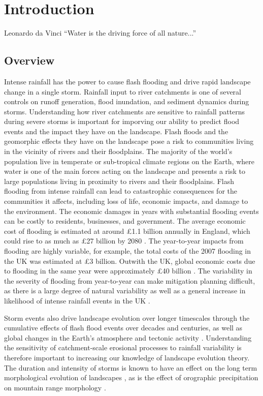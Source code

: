 \chapter{Introduction}
\label{chapter_intro}

\begin{chapquote}{Leonardo da Vinci \textit{}}
``Water is the driving force of all nature...''
\end{chapquote}

\section{Overview}

Intense rainfall has the power to cause flash flooding and drive rapid landscape change in a single storm. Rainfall input to river catchments is one of several controls on runoff generation, flood inundation, and sediment dynamics during storms. Understanding how river catchments are sensitive to rainfall patterns during severe storms is important for imporving our ability to predict flood events and the impact they have on the landscape.  Flash floods and the geomorphic effects they have on the landscape pose a risk to communities living in the vicinity of rivers and their floodplains. The majority of the world's population live in temperate or sub-tropical climate regions on the Earth, where water is one of the main forces acting on the landscape and presents a risk to large populations living in proximity to rivers and their floodplains. Flash flooding from intense rainfall can lead to catastrophic consequences for the communities it affects, including loss of life, economic impacts, and damage to the environment. The economic damages in years with substantial flooding events can be costly to residents, businesses, and government. The average economic cost of flooding is estimated at around £1.1 billion annually in England, which could rise to as much as £27 billion by 2080 \citep{bennett2014flood}. The year-to-year impacts from flooding are highly variable, for example, the total costs of the 2007 flooding in the UK was estimated at £3 billion. Outwith the UK, global economic costs due to flooding in the same year were approximately £40 billion \citep{pitt2008pitt}. The variability in the severity of flooding from year-to-year can make mitigation planning difficult, as there is a large degree of natural variability as well as a general increase in likelihood of intense rainfall events in the UK \citep{Kendon2014}. 

Storm events also drive landscape evolution over longer timescales through the cumulative effects of flash flood events over decades and centuries, as well as global changes in the Earth's atmosphere and tectonic activity \citep{Molnar1990,Molnar2001,whipple2006orogen}. Understanding the sensitivity of catchment-scale erosional processes to rainfall variability is therefore important to increasing our knowledge of landscape evolution theory. The duration and intensity of storms is known to have an effect on the long term morphological evolution of landscapes \citep{Solyom2004,solyom2007importance}, as is the effect of orographic precipitation on mountain range morphology \citep{han2015measuring}.

